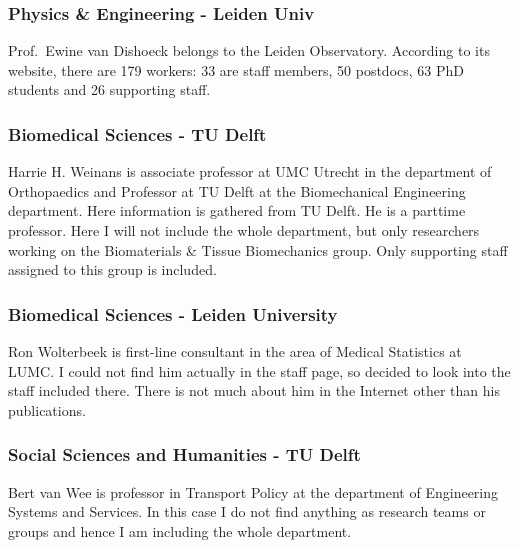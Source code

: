 \documentclass[]{elsarticle} %
\begin{document}
\hypertarget{physics-engineering---leiden-univ}{%
\subsubsection{Physics \& Engineering - Leiden
Univ}\label{physics-engineering---leiden-univ}}

Prof.~Ewine van Dishoeck belongs to the Leiden Observatory. According to
its website, there are 179 workers: 33 are staff members, 50 postdocs,
63 PhD students and 26 supporting staff.

\hypertarget{biomedical-sciences---tu-delft}{%
\subsubsection{Biomedical Sciences - TU
Delft}\label{biomedical-sciences---tu-delft}}

Harrie H. Weinans is associate professor at UMC Utrecht in the
department of Orthopaedics and Professor at TU Delft at the
Biomechanical Engineering department. Here information is gathered from
TU Delft. He is a parttime professor. Here I will not include the whole
department, but only researchers working on the Biomaterials \& Tissue
Biomechanics group. Only supporting staff assigned to this group is
included.

\hypertarget{biomedical-sciences---leiden-university}{%
\subsubsection{Biomedical Sciences - Leiden
University}\label{biomedical-sciences---leiden-university}}

Ron Wolterbeek is first-line consultant in the area of Medical
Statistics at LUMC. I could not find him actually in the staff page, so
decided to look into the staff included there. There is not much about
him in the Internet other than his publications.

\hypertarget{social-sciences-and-humanities---tu-delft}{%
\subsubsection{Social Sciences and Humanities - TU
Delft}\label{social-sciences-and-humanities---tu-delft}}

Bert van Wee is professor in Transport Policy at the department of
Engineering Systems and Services. In this case I do not find anything as
research teams or groups and hence I am including the whole department.
\end{document}
